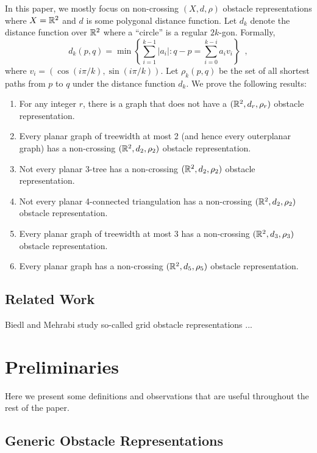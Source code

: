 \documentclass{patmorin}
\begin{document}
In this paper, we mostly focus on non-crossing $(X,d,\rho)$
obstacle representations where $X=\mathbb{R}^2$ and $d$ is some
polygonal distance function.  Let $d_k$ denote the distance
function over $\mathbb{R}^2$ where a ``circle'' is a regular $2k$-gon.
Formally, 
\[  
   d_k(p,q)=\min\left\{\sum_{i=1}^{k-1}|a_i|: 
                        q-p=\sum_{i=0}^{k-i}a_iv_i\right\} \enspace ,
\]
where $v_i=(\cos(i\pi/k), \sin(i\pi/k))$. Let $\rho_k(p,q)$ be the set
of all shortest paths from $p$ to $q$ under the distance function $d_k$.
We prove the following results:
\begin{enumerate}
   \item For any integer $r$, there is a graph that does not have a
     $(\mathbb{R}^2,d_r,\rho_r)$ obstacle representation.
   \item Every planar graph of treewidth at most 2 (and hence every
     outerplanar graph) has a non-crossing $(\mathbb{R}^2,d_2,\rho_2)$ obstacle
     representation.
   \item Not every planar 3-tree has a non-crossing $(\mathbb{R}^2,d_2,\rho_2)$
     obstacle representation.
   \item Not every planar 4-connected triangulation has a 
     non-crossing $(\mathbb{R}^2,d_2,\rho_2)$ obstacle representation.
   \item Every planar graph of treewidth at most 3 has a 
     non-crossing $(\mathbb{R}^2,d_3,\rho_3)$ obstacle representation.
   \item Every planar graph has a non-crossing $(\mathbb{R}^2,d_{5},\rho_{5})$
     obstacle representation.
\end{enumerate}

\subsection{Related Work}

Biedl and Mehrabi study so-called grid obstacle representations \cite{X}...


\section{Preliminaries}

Here we present some definitions and observations that are useful
throughout the rest of the paper.  

\subsection{Generic Obstacle Representations}
\end{document}
